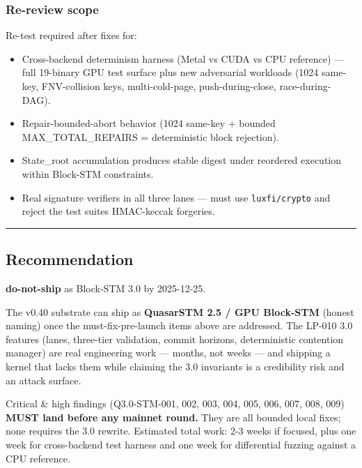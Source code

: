 \documentclass[
]{article}
\providecommand{\tightlist}{%
  \setlength{\itemsep}{0pt}\setlength{\parskip}{0pt}}
\begin{document}
\subsubsection{Re-review scope}\label{re-review-scope}

Re-test required after fixes for:

\begin{itemize}
\tightlist
\item
  Cross-backend determinism harness (Metal vs CUDA vs CPU reference) ---
  full 19-binary GPU test surface plus new adversarial workloads (1024
  same-key, FNV-collision keys, multi-cold-page, push-during-close,
  race-during-DAG).
\item
  Repair-bounded-abort behavior (1024 same-key + bounded
  MAX\_TOTAL\_REPAIRS = deterministic block rejection).
\item
  State\_root accumulation produces stable digest under reordered
  execution within Block-STM constraints.
\item
  Real signature verifiers in all three lanes --- must use
  \texttt{luxfi/crypto} and reject the test suite\textquotesingle s
  HMAC-keccak forgeries.
\end{itemize}

\begin{center}\rule{0.5\linewidth}{0.5pt}\end{center}

\subsection{Recommendation}\label{recommendation}

\textbf{do-not-ship} as Block-STM 3.0 by 2025-12-25.

The v0.40 substrate can ship as \textbf{QuasarSTM 2.5 / GPU Block-STM}
(honest naming) once the must-fix-pre-launch items above are addressed.
The LP-010 3.0 features (lanes, three-tier validation, commit horizons,
deterministic contention manager) are real engineering work --- months,
not weeks --- and shipping a kernel that lacks them while claiming the
3.0 invariants is a credibility risk and an attack surface.

Critical \& high findings (Q3.0-STM-001, 002, 003, 004, 005, 006, 007,
008, 009) \textbf{MUST land before any mainnet round.} They are all
bounded local fixes; none requires the 3.0 rewrite. Estimated total
work: 2-3 weeks if focused, plus one week for cross-backend test harness
and one week for differential fuzzing against a CPU reference.
\end{document}

